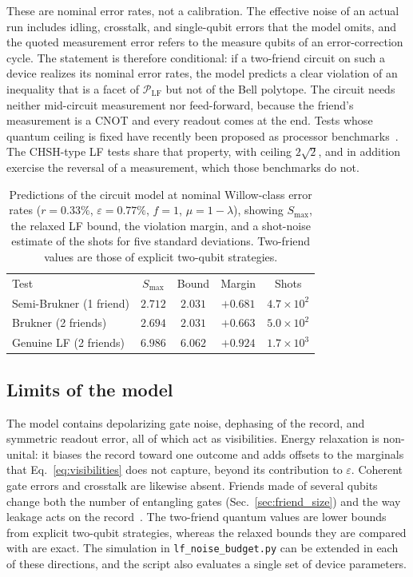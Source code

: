 These are nominal error rates, not a calibration. The effective noise of an actual run includes idling, crosstalk, and single-qubit errors that the model omits, and the quoted measurement error refers to the measure qubits of an error-correction cycle. The statement is therefore conditional: if a two-friend circuit on such a device realizes its nominal error rates, the model predicts a clear violation of an inequality that is a facet of $\mathcal{P}_{\mathrm{LF}}$ but not of the Bell polytope. The circuit needs neither mid-circuit measurement nor feed-forward, because the friend's measurement is a CNOT and every readout comes at the end. Tests whose quantum ceiling is fixed have recently been proposed as processor benchmarks~\cite{kumar2026}. The CHSH-type LF tests share that property, with ceiling $2\sqrt{2}$, and in addition exercise the reversal of a measurement, which those benchmarks do not.

\begin{table}[t]
\caption{Predictions of the circuit model at nominal Willow-class error rates ($r = 0.33\%$, $\varepsilon = 0.77\%$, $f = 1$, $\mu = 1 - \lambda$), showing $S_{\max}$, the relaxed LF bound, the violation margin, and a shot-noise estimate of the shots for five standard deviations. Two-friend values are those of explicit two-qubit strategies.}
\label{tab:low_noise_point}
\begin{ruledtabular}
\begin{tabular}{lcccc}
Test & $S_{\max}$ & Bound & Margin & Shots \\
\colrule
Semi-Brukner (1 friend) & $2.712$ & $2.031$ & $+0.681$ & $4.7 \times 10^2$ \\
Brukner (2 friends)     & $2.694$ & $2.031$ & $+0.663$ & $5.0 \times 10^2$ \\
Genuine LF (2 friends)  & $6.986$ & $6.062$ & $+0.924$ & $1.7 \times 10^3$ \\
\end{tabular}
\end{ruledtabular}
\end{table}

\subsection{Limits of the model}

The model contains depolarizing gate noise, dephasing of the record, and symmetric readout error, all of which act as visibilities. Energy relaxation is non-unital: it biases the record toward one outcome and adds offsets to the marginals that Eq.~\eqref{eq:visibilities} does not capture, beyond its contribution to $\varepsilon$. Coherent gate errors and crosstalk are likewise absent. Friends made of several qubits change both the number of entangling gates (Sec.~\ref{sec:friend_size}) and the way leakage acts on the record~\cite{zeng2024}. The two-friend quantum values are lower bounds from explicit two-qubit strategies, whereas the relaxed bounds they are compared with are exact. The simulation in \texttt{lf\_noise\_budget.py} can be extended in each of these directions, and the script also evaluates a single set of device parameters.
